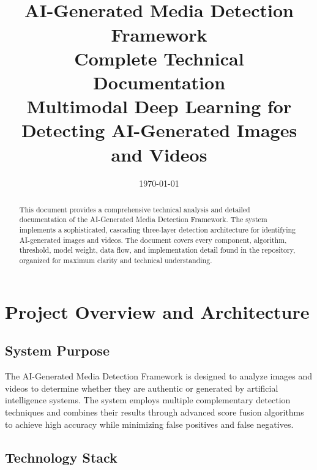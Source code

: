 \documentclass[12pt,a4paper]{book}
\title{\textbf{\\[2cm]AI-Generated Media Detection Framework}\\
        \textbf{Complete Technical Documentation}\\[1cm]
        \normalsize{Multimodal Deep Learning for Detecting AI-Generated Images and Videos}}
\author{}
\date{\today}
\begin{document}
\maketitle

\begin{abstract}
This document provides a comprehensive technical analysis and detailed documentation of the AI-Generated Media Detection Framework. The system implements a sophisticated, cascading three-layer detection architecture for identifying AI-generated images and videos. The document covers every component, algorithm, threshold, model weight, data flow, and implementation detail found in the repository, organized for maximum clarity and technical understanding.
\end{abstract}

\tableofcontents
\newpage

\chapter{Project Overview and Architecture}
\label{ch:overview}

\section{System Purpose}
The AI-Generated Media Detection Framework is designed to analyze images and videos to determine whether they are authentic or generated by artificial intelligence systems. The system employs multiple complementary detection techniques and combines their results through advanced score fusion algorithms to achieve high accuracy while minimizing false positives and false negatives.

\section{Technology Stack}
\end{document}
